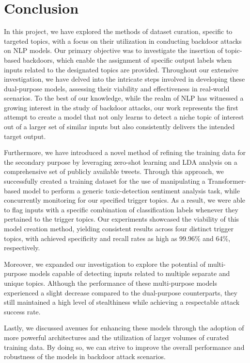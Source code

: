 \chapter{Conclusion}

In this project, we have explored the methods of dataset curation, specific to targeted topics, with a focus on their utilization in conducting backdoor attacks on NLP models. Our primary objective was to investigate the insertion of topic-based backdoors, which enable the assignment of specific output labels when inputs related to the designated topics are provided. Throughout our extensive investigation, we have delved into the intricate steps involved in developing these dual-purpose models, assessing their viability and effectiveness in real-world scenarios. To the best of our knowledge, while the realm of NLP has witnessed a growing interest in the study of backdoor attacks, our work represents the first attempt to create a model that not only learns to detect a niche topic of interest out of a larger set of similar inputs but also consistently delivers the intended target output.

Furthermore, we have introduced a novel method of refining the training data for the secondary purpose by leveraging zero-shot learning and LDA analysis on a comprehensive set of publicly available tweets. Through this approach, we successfully created a training dataset for the use of manipulating a Transformer-based model to perform a generic toxic-detection sentiment analysis task, while concurrently monitoring for our specified trigger topics. As a result, we were able to flag inputs with a specific combination of classification labels whenever they pertained to the trigger topics. Our experiments showcased the viability of this model creation method, yielding consistent results across four distinct trigger topics, with achieved specificity and recall rates as high as 99.96\% and 64\%, respectively.

Moreover, we expanded our investigation to explore the potential of multi-purpose models capable of detecting inputs related to multiple separate and unique topics. Although the performance of these multi-purpose models experienced a slight decrease compared to the dual-purpose counterparts, they still maintained a high level of stealthiness while achieving a respectable attack success rate.

Lastly, we discussed avenues for enhancing these models through the adoption of more powerful architectures and the utilization of larger volumes of curated training data. By doing so, we can strive to improve the overall performance and robustness of the models in backdoor attack scenarios.

